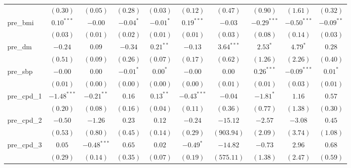 \begin{tabular}{l c c c c c c c c c}
                 & $(0.30)$      & $(0.05)$      & $(0.28)$      & $(0.03)$      & $(0.12)$      & $(0.47)$       & $(0.90)$      & $(1.61)$       & $(0.32)$       \\
pre\_bmi         & $0.10^{***}$  & $-0.00$       & $-0.04^{*}$   & $-0.01^{*}$   & $0.19^{***}$  & $-0.03$        & $-0.29^{***}$ & $-0.50^{***}$  & $-0.09^{**}$   \\
                 & $(0.03)$      & $(0.01)$      & $(0.02)$      & $(0.01)$      & $(0.01)$      & $(0.03)$       & $(0.08)$      & $(0.14)$       & $(0.03)$       \\
pre\_dm          & $-0.24$       & $0.09$        & $-0.34$       & $0.21^{**}$   & $-0.13$       & $3.64^{***}$   & $2.53^{*}$    & $4.79^{*}$     & $0.28$         \\
                 & $(0.51)$      & $(0.09)$      & $(0.26)$      & $(0.07)$      & $(0.17)$      & $(0.62)$       & $(1.26)$      & $(2.26)$       & $(0.40)$       \\
pre\_sbp         & $-0.00$       & $0.00$        & $-0.01^{*}$   & $0.00^{*}$    & $-0.00$       & $0.00$         & $0.26^{***}$  & $-0.09^{***}$  & $0.01^{*}$     \\
                 & $(0.01)$      & $(0.00)$      & $(0.00)$      & $(0.00)$      & $(0.00)$      & $(0.01)$       & $(0.01)$      & $(0.03)$       & $(0.01)$       \\
pre\_cpd\_1      & $-1.48^{***}$ & $-0.21^{**}$  & $0.16$        & $0.13^{**}$   & $-0.43^{***}$ & $-0.04$        & $-1.81^{*}$   & $1.16$         & $0.57$         \\
                 & $(0.20)$      & $(0.08)$      & $(0.16)$      & $(0.04)$      & $(0.11)$      & $(0.36)$       & $(0.77)$      & $(1.38)$       & $(0.30)$       \\
pre\_cpd\_2      & $-0.50$       & $-1.26$       & $0.23$        & $0.12$        & $-0.24$       & $-15.12$       & $-2.57$       & $-3.08$        & $0.45$         \\
                 & $(0.53)$      & $(0.80)$      & $(0.45)$      & $(0.14)$      & $(0.29)$      & $(903.94)$     & $(2.09)$      & $(3.74)$       & $(1.08)$       \\
pre\_cpd\_3      & $0.05$        & $-0.48^{***}$ & $0.65$        & $0.02$        & $-0.49^{*}$   & $-14.82$       & $-0.73$       & $2.96$         & $0.68$         \\
                 & $(0.29)$      & $(0.14)$      & $(0.35)$      & $(0.07)$      & $(0.19)$      & $(575.11)$     & $(1.38)$      & $(2.47)$       & $(0.59)$       \\

\end{tabular}
